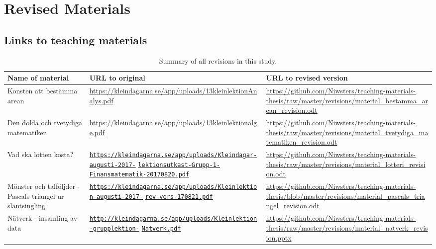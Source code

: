\chapter{Revised Materials}

\section{Links to teaching materials}
\bgroup
\def\arraystretch{1.5}
\begin{table}[H]
\begin{adjustwidth}{-2cm}{}
\centering
\caption{Summary of all revisions in this study.}
  \begin{tabular}{p{4.5cm}p{7cm}p{6.5cm}} \hline\hline
  \textbf{Name of material} & \textbf{URL to original} & \textbf{URL to revised version} \\ \hline
  Konsten att bestämma arean & \url{https://kleindagarna.se/app/uploads/13kleinlektionAnalys.pdf} & \url{https://github.com/Niwsters/teaching-materials-thesis/raw/master/revisions/material_bestamma_arean_revision.odt} \\ \hline
  Den dolda och tvetydiga matematiken & \url{https://kleindagarna.se/app/uploads/13kleinlektionalge.pdf} & \url{https://github.com/Niwsters/teaching-materials-thesis/raw/master/revisions/material_tvetydiga_matematiken_revision.odt} \\ \hline
  Vad ska lotten kosta? & \href{https://kleindagarna.se/app/uploads/Kleindagar-augusti-2017-lektionsutkast-Grupp-1-Finansmatematik-20170820.pdf}{\nolinkurl{https://kleindagarna.se/app/uploads/Kleindagar-augusti-2017-}} \href{https://kleindagarna.se/app/uploads/Kleindagar-augusti-2017-lektionsutkast-Grupp-1-Finansmatematik-20170820.pdf}{\nolinkurl{lektionsutkast-Grupp-1-}} \href{https://kleindagarna.se/app/uploads/Kleindagar-augusti-2017-lektionsutkast-Grupp-1-Finansmatematik-20170820.pdf}{\nolinkurl{Finansmatematik-20170820.pdf}}& \url{https://github.com/Niwsters/teaching-materials-thesis/raw/master/revisions/material_lotteri_revision.odt}\\ \hline
  Mönster och talföljder - Pascals triangel ur slantsingling & \href{https://kleindagarna.se/app/uploads/Kleinlektion-augusti-2017-rev-vers-170821.pdf}{\nolinkurl{https://kleindagarna.se/app/uploads/Kleinlektion-augusti-2017-}} \href{https://kleindagarna.se/app/uploads/Kleinlektion-augusti-2017-rev-vers-170821.pdf}{\nolinkurl{rev-vers-170821.pdf}} & \url{https://github.com/Niwsters/teaching-materials-thesis/blob/master/revisions/material_pascals_triangel_revision.odt} \\ \hline
  Nätverk - insamling av data & \href{http://kleindagarna.se/app/uploads/Kleinlektion-grupplektion-Natverk.pdf}{\nolinkurl{http://kleindagarna.se/app/uploads/Kleinlektion-grupplektion-}} \href{http://kleindagarna.se/app/uploads/Kleinlektion-grupplektion-Natverk.pdf}{\nolinkurl{Natverk.pdf}} & \url{https://github.com/Niwsters/teaching-materials-thesis/raw/master/revisions/material_natverk_revision.pptx}\\ \hline
\end{tabular}
\label{app:revisions}
\end{adjustwidth}
\end{table}
\egroup

